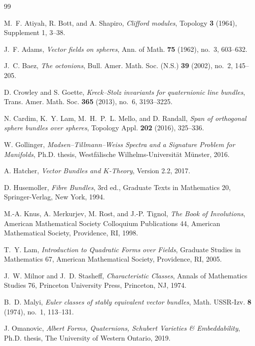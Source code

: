 \documentclass[12pt]{article}
\theoremstyle{plain}
\theoremstyle{definition}
\begin{document}
\begin{thebibliography}{99}
	
	M.~F. Atiyah, R. Bott, and A. Shapiro,
	\emph{Clifford modules},
	Topology \textbf{3} (1964), Supplement 1, 3--38.
	
	J.~F. Adams,
	\emph{Vector fields on spheres},
	Ann. of Math. \textbf{75} (1962), no.~3, 603--632.
	
	J.~C. Baez,
	\emph{The octonions},
	Bull. Amer. Math. Soc. (N.S.) \textbf{39} (2002), no.~2, 145--205.
	
	D. Crowley and S. Goette,
	\emph{Kreck--Stolz invariants for quaternionic line bundles},
	Trans. Amer. Math. Soc. \textbf{365} (2013), no.~6, 3193--3225.
	
	N. Cardim, K.~Y. Lam, M.~H.~P.~L. Mello, and D. Randall,
	\emph{Span of orthogonal sphere bundles over spheres},
	Topology Appl. \textbf{202} (2016), 325--336.
	
	W. Gollinger,
	\emph{Madsen--Tillmann--Weiss Spectra and a Signature Problem for Manifolds},
	Ph.D. thesis, Westf\"alische Wilhelms-Universit\"at M\"unster, 2016.
	
	A. Hatcher,
	\emph{Vector Bundles and $K$-Theory},
	Version 2.2, 2017.
	
	D. Husemoller,
	\emph{Fibre Bundles},
	3rd ed., Graduate Texts in Mathematics 20,
	Springer-Verlag, New York, 1994.
	
	M.-A. Knus, A. Merkurjev, M. Rost, and J.-P. Tignol,
	\emph{The Book of Involutions},
	American Mathematical Society Colloquium Publications 44,
	American Mathematical Society, Providence, RI, 1998.
	
	T.~Y. Lam,
	\emph{Introduction to Quadratic Forms over Fields},
	Graduate Studies in Mathematics 67,
	American Mathematical Society, Providence, RI, 2005.
	
	J.~W. Milnor and J.~D. Stasheff,
	\emph{Characteristic Classes},
	Annals of Mathematics Studies 76,
	Princeton University Press, Princeton, NJ, 1974.
	
	B.~D. Malyi,
	\emph{Euler classes of stably equivalent vector bundles},
	Math. USSR-Izv. \textbf{8} (1974), no.~1, 113--131.
	
	J. Omanovic,
	\emph{Albert Forms, Quaternions, Schubert Varieties \& Embeddability},
	Ph.D. thesis, The University of Western Ontario, 2019.
	

\end{thebibliography}
\end{document}
